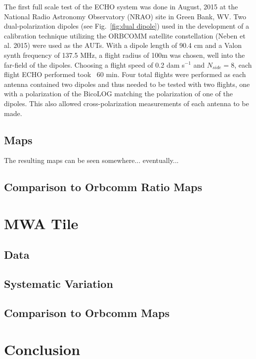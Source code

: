 \documentclass[draft,ras]{AGUJournal}
\begin{document}
The first full scale test of the ECHO system was done in August, 2015 at the National Radio Astronomy Observatory (NRAO) site in Green Bank, WV.  Two dual-polarization dipoles (see Fig.~\ref{fig:dual dipole}) used in the development of a calibration technique utilizing the ORBCOMM satellite constellation (Neben et al. 2015) were used as the AUTs.  With a dipole length of 90.4 cm and a Valon synth frequency of 137.5 MHz, a flight radius of 100m was chosen, well into the far-field of the dipoles.  Choosing a flight speed of 0.2 dam s$^{-1}$ and $N_{side}=8$, each flight ECHO performed took ~60 min.  Four total flights were performed as each antenna contained two dipoles and thus needed to be tested with two flights, one with a polarization of the BicoLOG matching the polarization of one of the dipoles.  This also allowed cross-polarization measurements of each antenna to be made.


\subsection{Maps}

The resulting maps can be seen somewhere... eventually...

\subsection{Comparison to Orbcomm Ratio Maps}




\section{MWA Tile}

\subsection{Data}

\subsection{Systematic Variation}

\subsection{Comparison to Orbcomm Maps}





\section{Conclusion}
\end{document}
